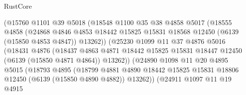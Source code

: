 \begin{lexlean}{RustCore}
\begin{coremodule}
                          (@15760
                            @1101
                            @39
                            @5018
                            (@18548
                              @1100
                              @35
                              @38
                              @4858
                              @5017
                              (@18555
                                @4858
                                (@24868
                                  @4846
                                  @4853
                                  @18442
                                  @15825
                                  @15831
                                  @18568
                                  @12450
                                  (@6139 (@15850 @4853 @4847))
                                  @13262))
                              (@25230
                                @1099
                                @11
                                @37
                                @4876
                                @5016
                                (@18431
                                  @4876
                                  (@18437
                                    @4863
                                    @4871
                                    @18442
                                    @15825
                                    @15831
                                    @18447
                                    @12450
                                    (@6139 (@15850 @4871 @4864))
                                    @13262))
                                (@24890
                                  @1098
                                  @11
                                  @20
                                  @4895
                                  @5015
                                  (@18793
                                    @4895
                                    (@18799
                                      @4881
                                      @4890
                                      @18442
                                      @15825
                                      @15831
                                      @18806
                                      @12450
                                      (@6139 (@15850 @4890 @4882))
                                      @13262))
                                  (@24911
                                    @1097
                                    @11
                                    @19
                                    @4915

\end{coremodule}
\end{lexlean}
